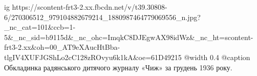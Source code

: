  
 
 
 
 

\ifcmt
  ig https://scontent-frt3-2.xx.fbcdn.net/v/t39.30808-6/270306512_979104882679214_1880987464779069556_n.jpg?_nc_cat=101&ccb=1-5&_nc_sid=b9115d&_nc_ohc=ImqkC8DJEgwAX98idWz&_nc_ht=scontent-frt3-2.xx&oh=00_AT9eXAucHtBba-tlgIV4XUFJGShLo2cC128zROvyu6k1kA&oe=61D49215
  @width 0.4
	@caption Обкладинка радянського дитячого журналу «Чиж» за грудень 1936 року.
\fi
